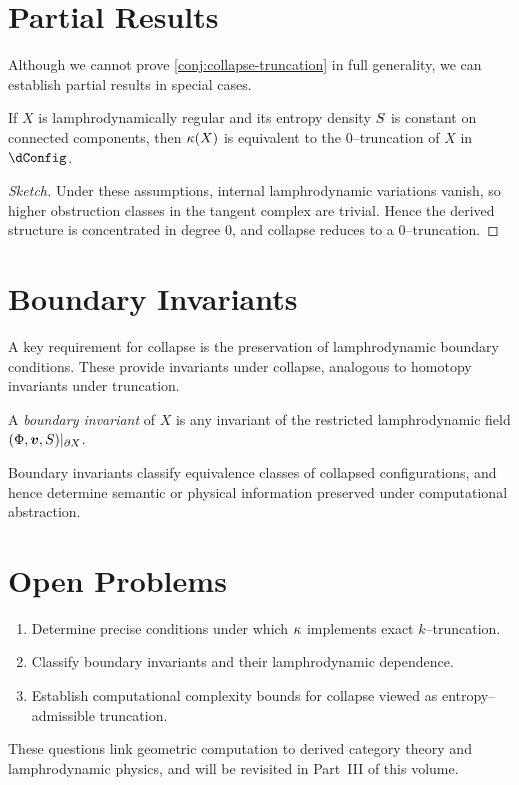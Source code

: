 \section{Partial Results}

Although we cannot prove \cref{conj:collapse-truncation} in full
generality, we can establish partial results in special cases.

\begin{proposition}
If $X$ is lamphrodynamically regular and its entropy density $S$
is constant on connected components, then $\kappa(X)$ is equivalent
to the $0$--truncation of $X$ in $\dConfig$.
\end{proposition}

\begin{proof}[Sketch]
Under these assumptions, internal lamphrodynamic variations vanish, so
higher obstruction classes in the tangent complex are trivial. Hence
the derived structure is concentrated in degree $0$, and collapse
reduces to a $0$--truncation.
\end{proof}

\section{Boundary Invariants}

A key requirement for collapse is the preservation of lamphrodynamic
boundary conditions. These provide invariants under collapse, analogous
to homotopy invariants under truncation.

\begin{definition}
A \emph{boundary invariant} of $X$ is any invariant of the restricted
lamphrodynamic field $(\Phi,\bm{v},S)|_{\partial X}$.
\end{definition}

\begin{remark}
Boundary invariants classify equivalence classes of collapsed
configurations, and hence determine semantic or physical information
preserved under computational abstraction.
\end{remark}

\section{Open Problems}

\begin{enumerate}
\item Determine precise conditions under which $\kappa$ implements
exact $k$--truncation.
\item Classify boundary invariants and their lamphrodynamic dependence.
\item Establish computational complexity bounds for collapse viewed as
entropy--admissible truncation.
\end{enumerate}

These questions link geometric computation to derived category theory
and lamphrodynamic physics, and will be revisited in
Part~III of this volume.
\newpage

